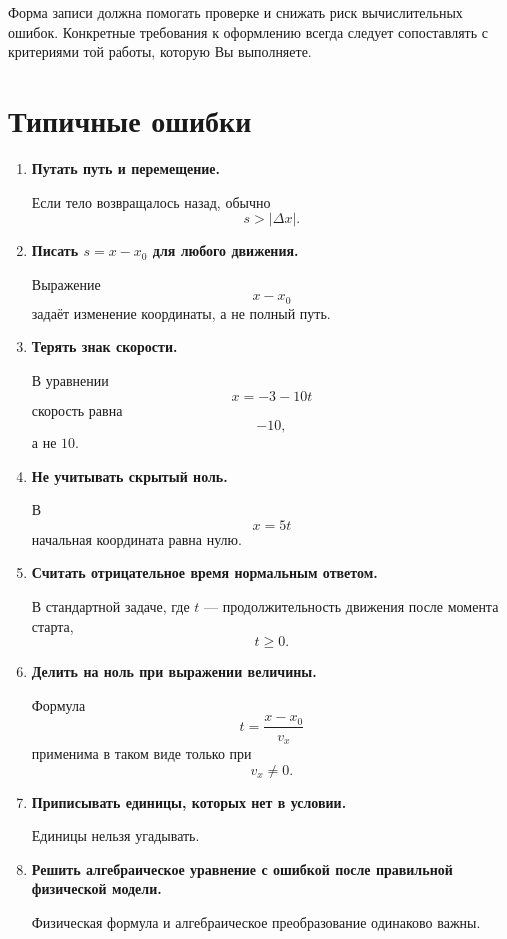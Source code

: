 \documentclass[a4paper,12pt]{article}
\newcommand{\important}[1]{\textbf{#1}}
\begin{document}
Форма записи должна помогать проверке и снижать риск вычислительных ошибок. Конкретные требования к оформлению всегда следует сопоставлять с критериями той работы, которую Вы выполняете.

\section{Типичные ошибки}

\begin{enumerate}
  \item \important{Путать путь и перемещение.}

  Если тело возвращалось назад, обычно
  \[
  s>|\Delta x|.
  \]

  \item \important{Писать \(s=x-x_0\) для любого движения.}

  Выражение
  \[
  x-x_0
  \]
  задаёт изменение координаты, а не полный путь.

  \item \important{Терять знак скорости.}

  В уравнении
  \[
  x=-3-10t
  \]
  скорость равна
  \[
  -10,
  \]
  а не \(10\).

  \item \important{Не учитывать скрытый ноль.}

  В
  \[
  x=5t
  \]
  начальная координата равна нулю.

  \item \important{Считать отрицательное время нормальным ответом.}

  В стандартной задаче, где \(t\) --- продолжительность движения после момента старта,
  \[
  t\ge0.
  \]

  \item \important{Делить на ноль при выражении величины.}

  Формула
  \[
  t=\frac{x-x_0}{v_x}
  \]
  применима в таком виде только при
  \[
  v_x\ne0.
  \]

  \item \important{Приписывать единицы, которых нет в условии.}

  Единицы нельзя угадывать.

  \item \important{Решить алгебраическое уравнение с ошибкой после правильной физической модели.}

  Физическая формула и алгебраическое преобразование одинаково важны.
\end{enumerate}
\end{document}
